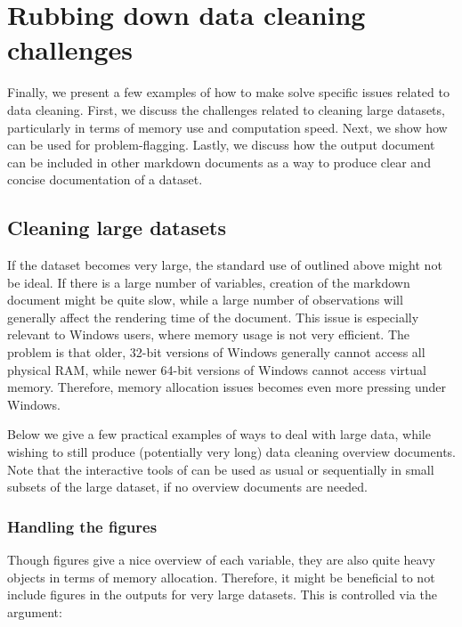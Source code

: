 \documentclass[article,shortnames]{jss}
\newcommand{\hl}[1]{\textcolor{magenta}{#1}}
\begin{document}
\section{Rubbing down data cleaning challenges}
\label{sec:specificExamples}

Finally, we present a few examples of how to make 
solve specific issues related to data cleaning. First, we discuss the
challenges related to cleaning large datasets, particularly in terms
of memory use and computation speed. Next, we show how 
can be used for problem-flagging. Lastly, we discuss how the
 output document can be included in other  markdown
documents as a way to produce clear and concise documentation of a
dataset. %

\subsection{Cleaning large datasets}
If the dataset becomes very large, the standard use of 
outlined above might not be ideal. If there is a large number of
variables, creation of the  markdown document might be quite
slow, while a large number of observations will generally affect the
rendering time of the document. This issue is especially relevant to
Windows users, where memory usage is not very efficient. The problem is that older,
32-bit versions of Windows generally cannot access all physical RAM,
while newer 64-bit versions of Windows cannot access virtual memory. Therefore,
memory allocation issues becomes even more pressing under Windows.

Below we give a few practical examples of ways to deal with large
data, while wishing to still produce (potentially very long) data
cleaning overview documents. Note that the interactive tools of
 can be used as usual or sequentially in small subsets
of the large dataset, if no overview documents are needed.

\subsubsection{Handling the figures}
Though figures give a nice overview of each variable, they are also
quite heavy objects in terms of memory allocation. Therefore, it might
be beneficial to not include figures in the  outputs for
very large datasets. This is controlled via the  argument:
\end{document}
